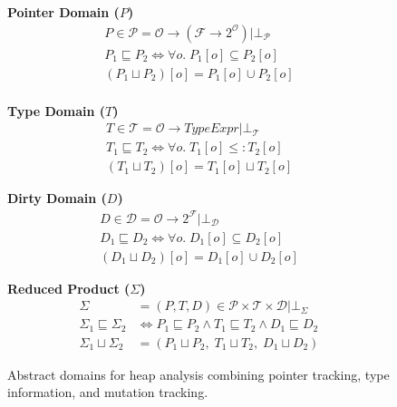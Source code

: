 \newcommand{\defeq}{\overset{\text{\tiny def}}{=}}

\begin{figure*}[t]
\centering

\begin{minipage}[t]{0.32\textwidth}
\centering
\textbf{Pointer Domain ($P$)}
\begin{gather*}
P \in \mathcal{P} = \mathcal{O} \to (\mathcal{F} \to 2^{\mathcal{O}}) | \bot_\mathcal{P} \\[0.3em]
P_1 \sqsubseteq P_2 \iff \forall o.\; P_1[o] \subseteq P_2[o] \\[0.3em]
(P_1 \sqcup P_2)[o] = P_1[o] \cup P_2[o] \\
\end{gather*}
\end{minipage}%
\hfill
\begin{minipage}[t]{0.32\textwidth}
\centering
\textbf{Type Domain ($T$)}
\begin{gather*}
T \in \mathcal{T} = \mathcal{O} \to \mathit{TypeExpr} | \bot_\mathcal{T} \\[0.3em]
T_1 \sqsubseteq T_2 \iff \forall o.\; T_1[o] \leq: T_2[o] \\[0.3em]
(T_1 \sqcup T_2)[o] = T_1[o] \sqcup T_2[o]
\end{gather*}
\end{minipage}%
\hfill
\begin{minipage}[t]{0.32\textwidth}
\centering
\textbf{Dirty Domain ($D$)}
\begin{gather*}
D \in \mathcal{D} = \mathcal{O} \to 2^{\mathcal{F}} | \bot_\mathcal{D} \\[0.3em]
D_1 \sqsubseteq D_2 \iff \forall o.\; D_1[o] \subseteq D_2[o] \\[0.3em]
(D_1 \sqcup D_2)[o] = D_1[o] \cup D_2[o]
\end{gather*}
\end{minipage}

\vspace{1.5em}

\noindent\textbf{Reduced Product ($\Sigma$)}
\begin{align*}
\Sigma &= (P,T,D) \in \mathcal{P} \times \mathcal{T} \times \mathcal{D} | \bot_\Sigma\\[0.3em]
\Sigma_1 \sqsubseteq \Sigma_2 &\iff P_1 \sqsubseteq P_2 \land T_1 \sqsubseteq T_2 \land D_1 \sqsubseteq D_2 \\[0.3em]
\Sigma_1 \sqcup \Sigma_2 &= (P_1 \sqcup P_2,\; T_1 \sqcup T_2,\; D_1 \sqcup D_2)
\end{align*}

\caption{Abstract domains for heap analysis combining pointer tracking, type information, and mutation tracking.}
\label{fig:abstract-domains}
\end{figure*}

